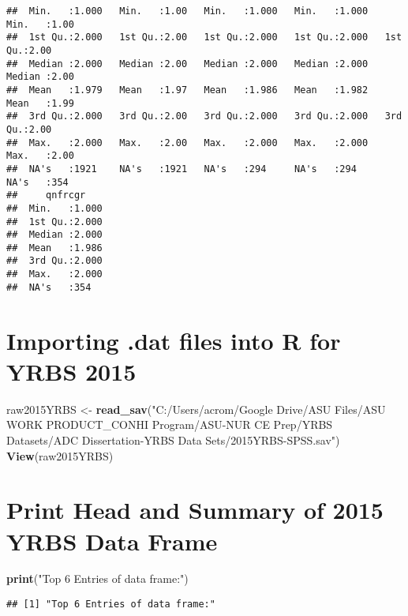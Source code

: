 \documentclass[
]{article}
\newenvironment{Shaded}{\begin{snugshade}}{\end{snugshade}}
\newcommand{\FunctionTok}[1]{\textcolor[rgb]{0.13,0.29,0.53}{\textbf{#1}}}
\newcommand{\NormalTok}[1]{#1}
\newcommand{\OtherTok}[1]{\textcolor[rgb]{0.56,0.35,0.01}{#1}}
\newcommand{\StringTok}[1]{\textcolor[rgb]{0.31,0.60,0.02}{#1}}
\begin{document}
\begin{verbatim}
##  Min.   :1.000   Min.   :1.00   Min.   :1.000   Min.   :1.000   Min.   :1.00  
##  1st Qu.:2.000   1st Qu.:2.00   1st Qu.:2.000   1st Qu.:2.000   1st Qu.:2.00  
##  Median :2.000   Median :2.00   Median :2.000   Median :2.000   Median :2.00  
##  Mean   :1.979   Mean   :1.97   Mean   :1.986   Mean   :1.982   Mean   :1.99  
##  3rd Qu.:2.000   3rd Qu.:2.00   3rd Qu.:2.000   3rd Qu.:2.000   3rd Qu.:2.00  
##  Max.   :2.000   Max.   :2.00   Max.   :2.000   Max.   :2.000   Max.   :2.00  
##  NA's   :1921    NA's   :1921   NA's   :294     NA's   :294     NA's   :354   
##     qnfrcgr     
##  Min.   :1.000  
##  1st Qu.:2.000  
##  Median :2.000  
##  Mean   :1.986  
##  3rd Qu.:2.000  
##  Max.   :2.000  
##  NA's   :354
\end{verbatim}

\hypertarget{importing-.dat-files-into-r-for-yrbs-2015}{%
\section{Importing .dat files into R for YRBS
2015}\label{importing-.dat-files-into-r-for-yrbs-2015}}

\begin{Shaded}
\begin{Highlighting}[]
\NormalTok{raw2015YRBS }\OtherTok{\textless{}{-}} \FunctionTok{read\_sav}\NormalTok{(}\StringTok{"C:/Users/acrom/Google Drive/ASU Files/ASU WORK PRODUCT\_CONHI Program/ASU{-}NUR CE Prep/YRBS Datasets/ADC Dissertation{-}YRBS Data Sets/2015YRBS{-}SPSS.sav"}\NormalTok{)}
\FunctionTok{View}\NormalTok{(raw2015YRBS)}
\end{Highlighting}
\end{Shaded}

\hypertarget{print-head-and-summary-of-2015-yrbs-data-frame}{%
\section{Print Head and Summary of 2015 YRBS Data
Frame}\label{print-head-and-summary-of-2015-yrbs-data-frame}}

\begin{Shaded}
\begin{Highlighting}[]
\FunctionTok{print}\NormalTok{(}\StringTok{"Top 6 Entries of data frame:"}\NormalTok{)}
\end{Highlighting}
\end{Shaded}

\begin{verbatim}
## [1] "Top 6 Entries of data frame:"
\end{verbatim}
\end{document}

